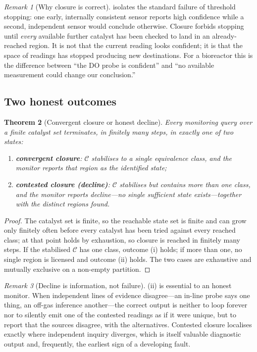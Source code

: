 \documentclass[11pt,twocolumn,a4paper]{article}
\theoremstyle{thmstyle}
\newtheorem{theorem}{Theorem}[section]
\theoremstyle{definition}
\theoremstyle{remark}
\newtheorem{remark}[theorem]{Remark}
\begin{document}
\begin{remark}[Why closure is correct]
\label{rem:closure-correct}
 isolates the standard failure of threshold
stopping: one early, internally consistent sensor reports high confidence
while a second, independent sensor would conclude otherwise. Closure
forbids stopping until \emph{every} available further catalyst has been
checked to land in an already-reached region. It is not that the current
reading looks confident; it is that the space of readings has stopped
producing new destinations. For a bioreactor this is the difference between
``the DO probe is confident'' and ``no available measurement could change
our conclusion.''
\end{remark}

\subsection{Two honest outcomes}

\begin{theorem}[Convergent closure or honest decline]
\label{thm:decline}
Every monitoring query over a finite catalyst set terminates, in finitely
many steps, in exactly one of two states:
\begin{enumerate}[label=(\roman*),leftmargin=2.2em,nosep]
\item \textbf{convergent closure}: $\mathcal{C}$ stabilises to a single
equivalence class, and the monitor reports that region as the identified
state;
\item \textbf{contested closure (decline)}: $\mathcal{C}$ stabilises but
contains more than one class, and the monitor reports \emph{decline}---no
single sufficient state exists---together with the distinct regions found.
\end{enumerate}
\end{theorem}

\begin{proof}
The catalyst set is finite, so the reachable state set is finite and can
grow only finitely often before every catalyst has been tried against every
reached class; at that point  holds by exhaustion, so
closure is reached in finitely many steps. If the stabilised $\mathcal{C}$
has one class, outcome (i) holds; if more than one, no single region is
licensed and outcome (ii) holds. The two cases are exhaustive and mutually
exclusive on a non-empty partition.
\end{proof}

\begin{remark}[Decline is information, not failure]
\label{rem:decline}
(ii) is essential to an honest monitor. When independent
lines of evidence disagree---an in-line probe says one thing, an off-gas
inference another---the correct output is neither to loop forever nor to
silently emit one of the contested readings as if it were unique, but to
report that the sources disagree, with the alternatives. Contested closure
localises exactly where independent inquiry diverges, which is itself
valuable diagnostic output and, frequently, the earliest sign of a
developing fault.
\end{remark}
\end{document}
